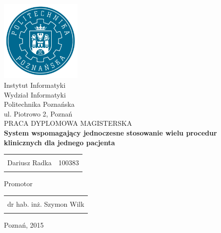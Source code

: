 \documentclass[oneside,a4paper]{book}
\begin{document}
\begin{titlepage}
\begin{center}

\includegraphics[width=0.3\textwidth]{img/put_logo.png}\\[0.1in]
\Large{Instytut Informatyki}\\
\normalsize
Wydział Informatyki\\
Politechnika Poznańska\\
ul. Piotrowo 2, Poznań \\[2cm]

\Large{PRACA DYPLOMOWA MAGISTERSKA}\\[1cm]

\Large \textbf {System wspomagający jednoczesne stosowanie wielu procedur klinicznych dla jednego pacjenta}\\[2cm]
\begin{table}[h]
\centering
\begin{tabular}{lr}\hline \\ 
Dariusz Radka & 100383 \\ \\ \hline 
\end{tabular}
\end{table}

\vspace{1cm}

\normalsize Promotor \\
\begin{table}[h]
\centering
\begin{tabular}{c}\hline \\
dr hab. inż. Szymon Wilk \\ \\ \hline 
\end{tabular}
\end{table}

\vspace{2cm}
Poznań, 2015

\vfill

\end{center}

\end{titlepage}
\end{document}
